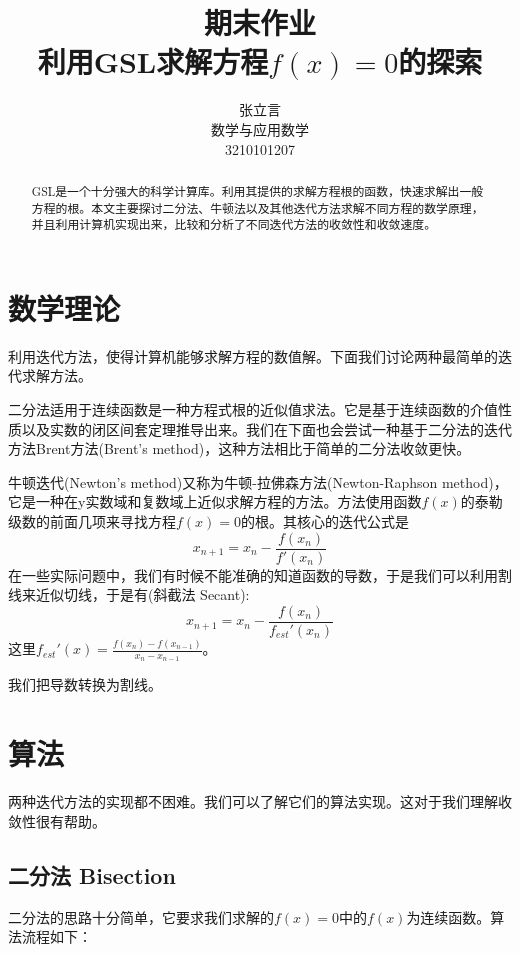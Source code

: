 \documentclass{ctexart}
\begin{document}
\pagestyle{empty}

\title{期末作业\\利用GSL求解方程$f(x)=0$的探索}
\author{张立言\\数学与应用数学\\3210101207}
\maketitle

\begin{abstract}
GSL是一个十分强大的科学计算库。利用其提供的求解方程根的函数，快速求解出一般方程的根。本文主要探讨二分法、牛顿法以及其他迭代方法求解不同方程的数学原理，并且利用计算机实现出来，比较和分析了不同迭代方法的收敛性和收敛速度。
\end{abstract}
\section{数学理论}
利用迭代方法，使得计算机能够求解方程的数值解。下面我们讨论两种最简单的迭代求解方法。\par
二分法适用于连续函数是一种方程式根的近似值求法。它是基于连续函数的介值性质以及实数的闭区间套定理推导出来。我们在下面也会尝试一种基于二分法的迭代方法Brent方法(Brent's method)，这种方法相比于简单的二分法收敛更快。\par
牛顿迭代(Newton's method)又称为牛顿-拉佛森方法(Newton-Raphson method)，它是一种在y实数域和复数域上近似求解方程的方法。\cite{wikien}方法使用函数$f(x)$的泰勒级数的前面几项来寻找方程$f(x)=0$的根。其核心的迭代公式是
\begin{equation}
  x_{n+1}=x_n-\frac{f(x_n)}{f'(x_n)}
\end{equation}
在一些实际问题中，我们有时候不能准确的知道函数的导数，于是我们可以利用割线来近似切线，于是有(斜截法 Secant):
\begin{equation}
  x_{n+1}=x_n-\frac{f(x_n)}{f_{est}'(x_n)}
\end{equation}
这里$f_{est}'(x)=\frac{f(x_n)-f(x_{n-1})}{x_n-x_{n-1}}$。\par
我们把导数转换为割线。
\section{算法}
两种迭代方法的实现都不困难。我们可以了解它们的算法实现。这对于我们理解收敛性很有帮助。
\subsection{二分法 Bisection}
二分法的思路十分简单，它要求我们求解的$f(x)=0$中的$f(x)$为连续函数。算法流程如下：
\end{document}
